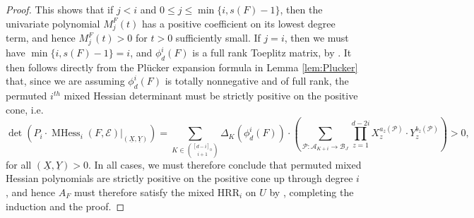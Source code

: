\documentclass[unnumsec,webpdf,modern,medium]{oup-authoring-template}
\theoremstyle{theorem}
\theoremstyle{definition}
\begin{document}
\begin{proof}
	This shows that if $j<i$ and $0\leq j\leq \min\{i,s(F)-1\}$, then the univariate polynomial
	$M^F_j(t)$ has a positive coefficient on its lowest degree term, and hence $M^F_j(t)>0$ for $t>0$ sufficiently small.  If $j=i$, then we must have $\min\{i,s(F)-1\}=i$, and $\phi^i_d(F)$ is a full rank Toeplitz matrix, by \cite[Lemma 4.5]{MMS}.  It then follows directly from the Pl\"ucker expansion formula in Lemma \ref{lem:Plucker} that, since we are assuming $\phi^i_d(F)$ is totally nonnegative and of full rank, the permuted $i^{th}$ mixed Hessian determinant must be strictly positive on the positive cone, i.e. 
	$$\det\left(P_i\cdot\operatorname{MHess}_i(F,\mathcal{E})|_{(\underline{X},\underline{Y})}\right)=\sum_{K\in\binom{[d-i]_0}{i+1}}\Delta_K(\phi^i_d(F))\cdot\left(\sum_{\mathcal{P}\colon \mathcal{A}_{K+i}\rightarrow\mathcal{B}_J}\prod_{z=1}^{d-2i}X_z^{a_z(\mathcal{P})}\cdot Y_z^{b_z(\mathcal{P})}\right)>0,$$
	for all $(\underline{X},\underline{Y})>0$.
	In all cases, we must therefore conclude that permuted mixed Hessian polynomials are strictly positive on the positive cone up through degree $i$, and hence $A_F$ must therefore satisfy the mixed HRR$_i$ on $U$ by \cite[Lemma 3.13]{MMS}, completing the induction and the proof. 
\end{proof}
\end{document}
